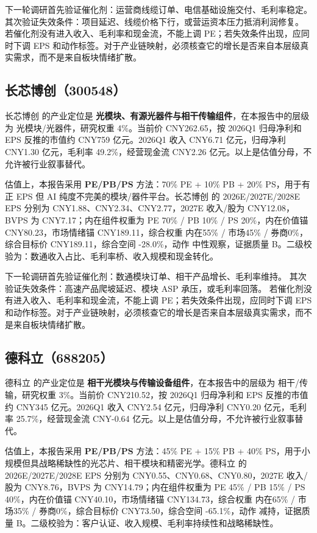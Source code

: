 下一轮调研首先验证催化剂：运营商线缆订单、电信基础设施交付、毛利率稳定。 其次验证失效条件：项目延迟、线缆价格下行，或营运资本压力抵消利润修复。 若催化剂没有进入收入、毛利率和现金流，不能上调 PE；若失效条件出现，应同时下调 EPS 和动作标签。对于产业链映射，必须核查它的增长是否来自本层级真实需求，而不是来自板块情绪扩散。


\subsection{长芯博创（300548）}
长芯博创 的产业定位是 \textbf{光模块、有源光器件与相干传输组件}，在本报告中的层级为 光模块/光器件，研究权重 4\%。当前价 CNY262.65，按 2026Q1 归母净利和 EPS 反推的市值约 CNY759 亿元。2026Q1 收入 CNY6.71 亿元，归母净利 CNY1.30 亿元，毛利率 49.2\%，经营现金流 CNY2.26 亿元。以上是估值分母，不允许被行业叙事替代。

估值上，本报告采用 \textbf{PE/PB/PS} 方法：70\% PE + 10\% PB + 20\% PS，用于有正 EPS 但 AI 纯度不完美的模块/器件平台。长芯博创 的 2026E/2027E/2028E EPS 分别为 CNY1.88、CNY2.34、CNY2.77，2027E 收入/股为 CNY12.08，BVPS 为 CNY7.17；内在组件权重为 PE 70\% / PB 10\% / PS 20\%，内在价值锚 CNY80.23，市场情绪锚 CNY189.11，综合权重 内在55\% / 市场45\% / 券商0\%，综合目标价 CNY189.11，综合空间 -28.0\%，动作 中性观察，证据质量 B。二级校验为：数通收入占比、毛利率桥、收入规模和现金转化。

下一轮调研首先验证催化剂：数通模块订单、相干产品增长、毛利率维持。 其次验证失效条件：高速产品爬坡延迟、模块 ASP 承压，或毛利率回落。 若催化剂没有进入收入、毛利率和现金流，不能上调 PE；若失效条件出现，应同时下调 EPS 和动作标签。对于产业链映射，必须核查它的增长是否来自本层级真实需求，而不是来自板块情绪扩散。


\subsection{德科立（688205）}
德科立 的产业定位是 \textbf{相干光模块与传输设备组件}，在本报告中的层级为 相干/传输，研究权重 3\%。当前价 CNY210.52，按 2026Q1 归母净利和 EPS 反推的市值约 CNY345 亿元。2026Q1 收入 CNY2.54 亿元，归母净利 CNY0.20 亿元，毛利率 25.7\%，经营现金流 CNY-0.64 亿元。以上是估值分母，不允许被行业叙事替代。

估值上，本报告采用 \textbf{PE/PB/PS} 方法：45\% PE + 15\% PB + 40\% PS，用于小规模但具战略稀缺性的光芯片、相干模块和精密光学。德科立 的 2026E/2027E/2028E EPS 分别为 CNY0.55、CNY0.68、CNY0.80，2027E 收入/股为 CNY8.76，BVPS 为 CNY14.79；内在组件权重为 PE 45\% / PB 15\% / PS 40\%，内在价值锚 CNY40.10，市场情绪锚 CNY134.73，综合权重 内在65\% / 市场35\% / 券商0\%，综合目标价 CNY73.50，综合空间 -65.1\%，动作 减持，证据质量 B。二级校验为：客户认证、收入规模、毛利率持续性和战略稀缺性。

